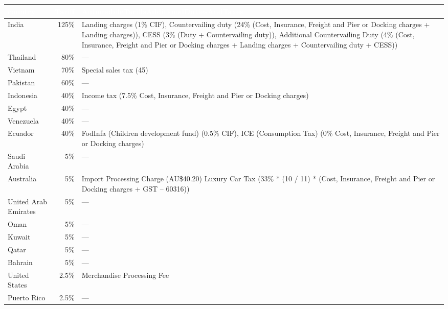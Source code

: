 \footnotesize{
\begin{tabularx}{\textwidth}{|l|r|X|}
    \hline
\rowcolor{black} \textcolor{white}{\textbf{country}} & \textcolor{white}{\textbf{Tariff}} & \textcolor{white}{\textbf{AutomobileTariffsAdditionalDutiesAndTaxes}} \\ \hline
India & 125\% & Landing charges (1\% CIF), Countervailing duty (24\% (Cost, Insurance, Freight and Pier or Docking charges + Landing charges)), CESS (3\% (Duty + Countervailing duty)), Additional Countervailing Duty (4\% (Cost, Insurance, Freight and Pier or Docking charges + Landing charges + Countervailing duty + CESS)) \\ \hline
Thailand & 80\% & — \\ \hline
Vietnam & 70\% & Special sales tax (45) \\ \hline
Pakistan & 60\% & — \\ \hline
Indonesia & 40\% & Income tax (7.5\% Cost, Insurance, Freight and Pier or Docking charges) \\ \hline
Egypt & 40\% & — \\ \hline
Venezuela & 40\% & — \\ \hline
Ecuador & 40\% & FodInfa (Children development fund) (0.5\% CIF), ICE (Consumption Tax) (0\% Cost, Insurance, Freight and Pier or Docking charges) \\ \hline
Saudi Arabia & 5\% & — \\ \hline
Australia & 5\% & Import Processing Charge (AU\$40.20) Luxury Car Tax (33\% * (10 / 11) * (Cost, Insurance, Freight and Pier or Docking charges + GST – 60316)) \\ \hline
United Arab Emirates & 5\% & — \\ \hline
Oman & 5\% & — \\ \hline
Kuwait & 5\% & — \\ \hline
Qatar & 5\% & — \\ \hline
Bahrain & 5\% & — \\ \hline
United States & 2.5\% & Merchandise Processing Fee \\ \hline
Puerto Rico & 2.5\% & — \\ \hline
\end{tabularx}
}